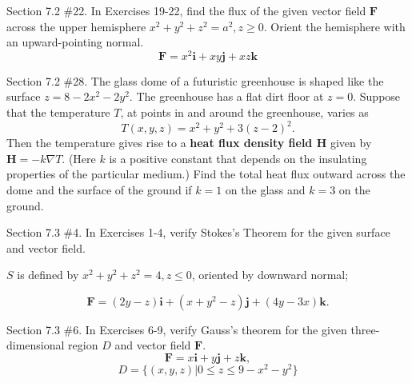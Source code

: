 \documentclass[12pt,letterpaper]{hmcpset}
\begin{document}
\newpage

\begin{problem}
Section 7.2 \#22. In Exercises 19-22, find the flux of the given vector field $\mathbf{F}$ across the upper hemisphere $ x^2 + y^2 + z^2 = a^2, z \geq 0$. Orient the hemisphere with an upward-pointing normal.
$$ \mathbf{F} = x^2 \mathbf{i} + xy \mathbf{j} + xz \mathbf{k} $$
\end{problem}

\newpage

\begin{problem}
Section 7.2 \#28. The glass dome of a futuristic greenhouse is shaped like the surface $ z = 8 - 2x^2 - 2y^2 $. The greenhouse has a flat dirt floor at $z = 0$. Suppose that the temperature $T$, at points in and around the greenhouse, varies as
$$ T(x, y, z) = x^2 + y^2 + 3(z-2)^2. $$
Then the temperature gives rise to a \textbf{heat flux density field $\mathbf{H}$} given by $\mathbf{H} = -k \nabla T$. (Here $k$ is a positive constant that depends on the insulating properties of the particular medium.) Find the total heat flux outward across the dome and the surface of the ground if $k = 1$ on the glass and $k = 3$ on the ground.
\end{problem}

\newpage

\begin{problem}
Section 7.3 \#4. In Exercises 1-4, verify Stokes's Theorem for the given surface and vector field.
\begin{center}
$S$ is defined by $x^2 + y^2 + z^2 = 4, z \leq 0$, oriented by downward normal;
\end{center}
$$ \mathbf{F} = (2y - z) \mathbf{i} + (x + y^2 - z) \mathbf{j} + (4y - 3x) \mathbf {k}. $$
\end{problem}

\newpage

\begin{problem}
Section 7.3 \#6. In Exercises 6-9, verify Gauss's theorem for the given three-dimensional region $D$ and vector field $\mathbf{F}$.
$$ \mathbf{F} = x \mathbf{i} + y \mathbf {j} + z \mathbf {k}, $$
$$ D = \{ (x, y, z) | 0 \leq z \leq 9 - x^2 - y^2 \} $$
\end{problem}
\end{document}
